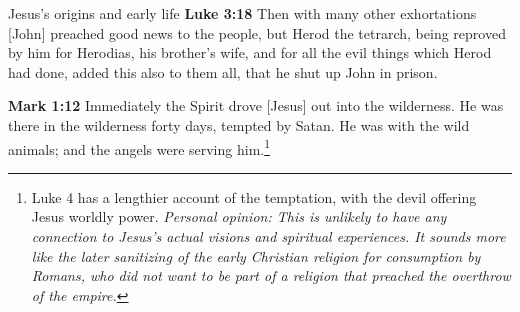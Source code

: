 \documentclass[10pt,twoside]{book}
\newcommand{\quotesize}{\normalsize{}}
\newenvironment{quotetext}{\begingroup\quotesize}{\endgroup}
\newcommand{\bible}[2]{\begin{quotetext}\textbf{#1} #2\end{quotetext}}
\newcommand{\gospelmark}[2]{\bible{Mark #1}{#2}}
\newcommand{\luke}[2]{\bible{Luke #1}{#2}}
\newcommand{\personal}[1]{\emph{Personal opinion:\/ #1}}
\begin{document}
\begin{section}{Jesus's origins and early life}
\luke{3:18}{Then with many other exhortations [John] preached good news to the people, but Herod the tetrarch, being reproved by him for Herodias, his brother’s wife, and for all the evil things which Herod had done, added this also to them all, that he shut up John in prison.}

\gospelmark{1:12}{Immediately the Spirit drove [Jesus] out into the
wilderness. He was there in the wild\-erness forty days, tempted by
Satan. He was with the wild animals; and the angels were serving him.\footnote{Luke 4 has a lengthier account of
the temptation, with the devil offering Jesus worldly power. \personal{This is unlikely to have any connection to
Jesus's actual visions and spiritual experiences. It sounds more like the later sanitizing of the early
Christian religion for consumption by Romans, who did not want to be part of a religion that preached the overthrow
of the empire.}}}
\end{section}
\end{document}
